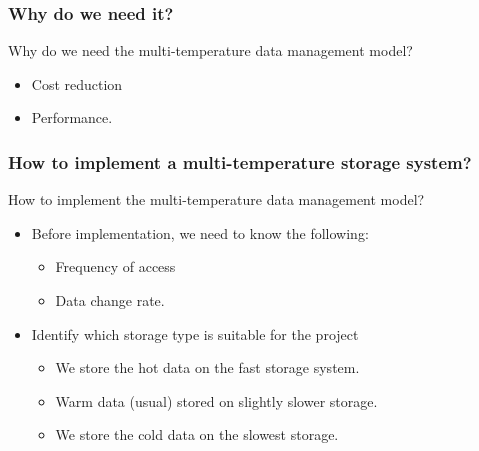 
\begin{frame}
    \frametitle{Why do we need it?}

    \begin{wideitemize}
        \item Why do we need the multi-temperature data management model?
        \begin{itemize}[<+->]
            \item Cost reduction \blue{\faDollar \faDollar \faDollar \faDollar}
            \item Performance.
        \end{itemize}
    \end{wideitemize}
\end{frame}

\begin{frame}
    \frametitle{How to implement a multi-temperature storage system? }

    \begin{wideitemize}
        \item How to implement the multi-temperature data management model?
        \begin{itemize}[<+->]
            \item Before implementation, we need to know the following:
            \begin{itemize}[<+->]
                \item Frequency of access
                \item Data change rate.
            \end{itemize}
            \item Identify which storage type is suitable for the project
            \begin{itemize}[<+->]
                 \item We store the hot data on the fast storage system.
                 \item Warm data (usual) stored on slightly slower storage.
                 \item We store the cold data on the slowest storage.
            \end{itemize}
        \end{itemize}
    \end{wideitemize}
\end{frame}


